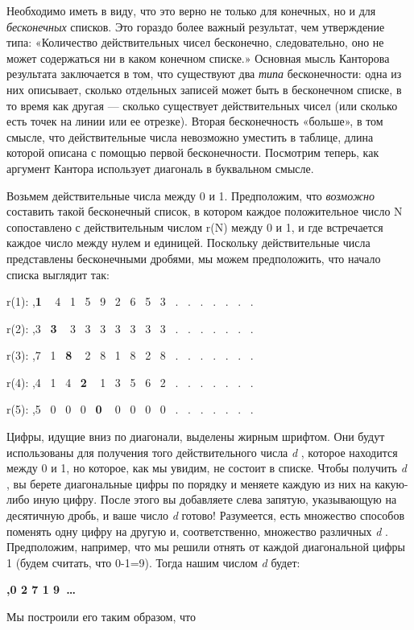 \documentclass[../main.tex]{subfiles}
\begin{document}
Необходимо иметь в виду, что это верно не только для конечных, но и для \emph{бесконечных} списков. Это гораздо более важный результат, чем утверждение типа: «Количество действительных чисел бесконечно, следовательно, оно не может содержаться ни в каком конечном списке.» Основная мысль Канторова результата заключается в том, что существуют два \emph{типа} бесконечности: одна из них описывает, сколько отдельных записей может быть в бесконечном списке, в то время как другая --- сколько существует действительных чисел (или сколько есть точек на линии или ее отрезке). Вторая бесконечность «больше», в том смысле, что действительные числа невозможно уместить в таблице, длина которой описана с помощью первой бесконечности. Посмотрим теперь, как аргумент Кантора использует диагональ в буквальном смысле.

Возьмем действительные числа между 0 и 1. Предположим, что \emph{возможно} составить такой бесконечный список, в котором каждое положительное число N сопоставлено с действительным числом r(N) между 0 и 1, и где встречается каждое число между нулем и единицей. Поскольку действительные числа представлены бесконечными дробями, мы можем предположить, что начало списка выглядит так:

r(1): ,\textbf{1} ~ 4~ 1~ 5~ 9~ 2~ 6~ 5~ 3~ .~ .~ .~ .~ .~ .~ .

r(2): ,3~ \textbf{3} ~ 3~ 3~ 3~ 3~ 3~ 3~ 3~ .~ .~ .~ .~ .~ .~ .

r(3): ,7~ 1~ \textbf{8} ~ 2~ 8~ 1~ 8~ 2~ 8~ .~ .~ .~ .~ .~ .~ .

r(4): ,4~ 1~ 4~ \textbf{2} ~ 1~ 3~ 5~ 6~ 2~ .~ .~ .~ .~ .~ .~ .

r(5): ,5~ 0~ 0~ 0~ \textbf{0} ~ 0~ 0~ 0~ 0~ .~ .~ .~ .~ .~ .~ .

Цифры, идущие вниз по диагонали, выделены жирным шрифтом. Они будут использованы для получения того действительного числа \emph{d} , которое находится между 0 и 1, но которое, как мы увидим, не состоит в списке. Чтобы получить \emph{d} , вы берете диагональные цифры по порядку и меняете каждую из них на какую-либо иную цифру. После этого вы добавляете слева запятую, указывающую на десятичную дробь, и ваше число \emph{d} готово! Разумеется, есть множество способов поменять одну цифру на другую и, соответственно, множество различных \emph{d} . Предположим, например, что мы решили отнять от каждой диагональной цифры 1 (будем считать, что 0-1=9). Тогда нашим числом \emph{d} будет:

\textbf{,0 2 7 1 9~\ldots{}}

Мы построили его таким образом, что
\end{document}
